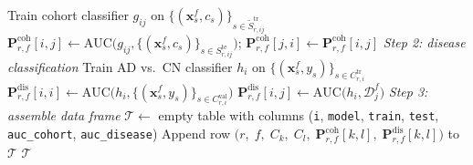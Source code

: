 \documentclass[11pt]{article}
\begin{document}
\begin{algorithm}[t]
\begin{algorithmic}[1]
      \State Train cohort classifier $g_{ij}$ on $\{(\mathbf{x}^{f}_{s}, c_s)\}_{s \in \tilde{S}^{\text{tr}}_{r,ij}}$
      \State $\mathbf{P}^{\text{coh}}_{r,f}[i,j] \gets \mathrm{AUC}\big(g_{ij}, \{(\mathbf{x}^{f}_{s}, c_s)\}_{s \in S^{\text{te}}_{r,ij}}\big)$; \;
             $\mathbf{P}^{\text{coh}}_{r,f}[j,i] \gets \mathbf{P}^{\text{coh}}_{r,f}[i,j]$
    \EndFor
    \Statex \hspace{\algorithmicindent}\hspace{\algorithmicindent}\textit{Step 2: disease classification}
      \State Train AD vs.\ CN classifier $h_{i}$ on $\{(\mathbf{x}^{f}_{s}, y_s)\}_{s \in C^{\text{tr}}_{r,i}}$
      \State $\mathbf{P}^{\text{dis}}_{r,f}[i,i] \gets \mathrm{AUC}\big(h_{i}, \{(\mathbf{x}^{f}_{s}, y_s)\}_{s \in C^{\text{val}}_{r,i}}\big)$
        \State $\mathbf{P}^{\text{dis}}_{r,f}[i,j] \gets \mathrm{AUC}\big(h_{i}, \mathcal{D}^{f}_{j}\big)$
      \EndFor
    \EndFor
  \EndFor
\EndFor
\Statex \textit{Step 3: assemble data frame}
\State $\mathcal{T} \gets$ empty table with columns
       (\texttt{i}, \texttt{model}, \texttt{train}, \texttt{test}, \texttt{auc\_cohort}, \texttt{auc\_disease})
      \State Append row
             $\big(r,\; f,\; C_k,\; C_l,\; \mathbf{P}^{\text{coh}}_{r,f}[k,l],\; \mathbf{P}^{\text{dis}}_{r,f}[k,l]\big)$
             to $\mathcal{T}$
    \EndFor
  \EndFor
\EndFor
\State \Return $\mathcal{T}$ 
\end{algorithmic}
\end{algorithm}
\end{document}

